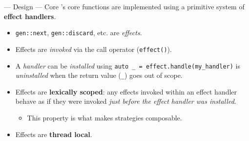 \begin{frame}{\halcheck{} --- Design --- Core}
  \halcheck{}'s core functions are implemented using a primitive system of \textbf{effect handlers}.

  \begin{itemize}
    \item<+-> \texttt{gen::next}, \texttt{gen::discard}, etc. are \emph{effects}.
    \item<+-> Effects are \emph{invoked} via the call operator (\texttt{effect()}).
    \item<+-> A \emph{handler} can be \emph{installed} using \texttt{auto _ = effect.handle(my_handler)} is \emph{uninstalled} when the return value (\texttt{_}) goes out of scope.
    \item<+-> Effects are \textbf{lexically scoped}: any effects invoked within an effect handler behave as if they were invoked \emph{just before the effect handler was installed}.
    \begin{itemize}
      \item This property is what makes strategies composable.
    \end{itemize}
    \item<+-> Effects are \textbf{thread local}.
  \end{itemize}
\end{frame}
